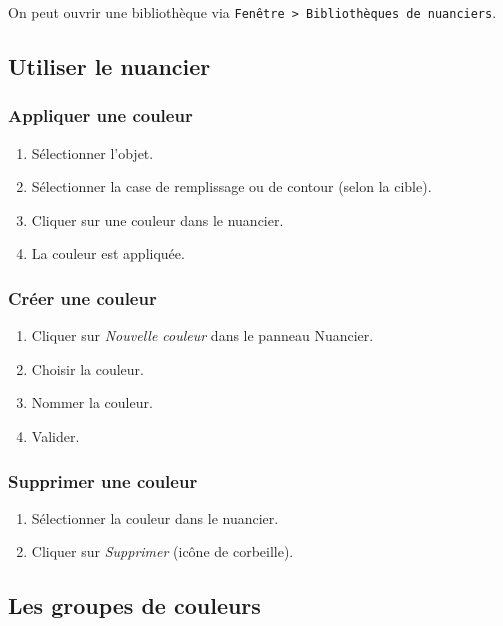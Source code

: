 On peut ouvrir une bibliothèque via \texttt{Fenêtre > Bibliothèques de nuanciers}.

\subsection{Utiliser le nuancier}

\subsubsection{Appliquer une couleur}

\begin{enumerate}
    \item Sélectionner l'objet.
    \item Sélectionner la case de remplissage ou de contour (selon la cible).
    \item Cliquer sur une couleur dans le nuancier.
    \item La couleur est appliquée.
\end{enumerate}

\subsubsection{Créer une couleur}

\begin{enumerate}
    \item Cliquer sur \emph{Nouvelle couleur} dans le panneau Nuancier.
    \item Choisir la couleur.
    \item Nommer la couleur.
    \item Valider.
\end{enumerate}

\subsubsection{Supprimer une couleur}

\begin{enumerate}
    \item Sélectionner la couleur dans le nuancier.
    \item Cliquer sur \emph{Supprimer} (icône de corbeille).
\end{enumerate}

\subsection{Les groupes de couleurs}

